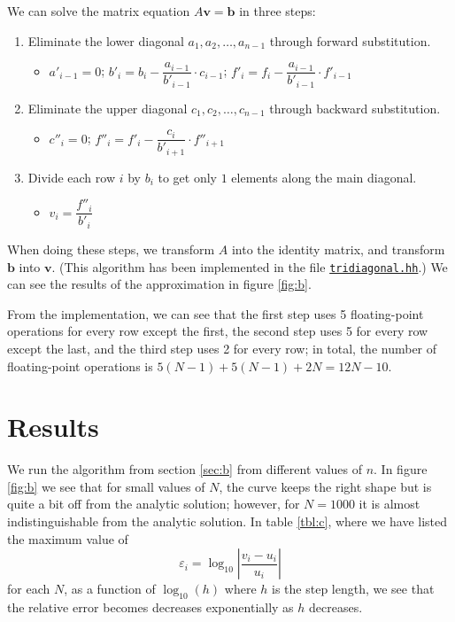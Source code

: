 \documentclass[12pt,a4paper]{article}
\newcommand\V[1]{\mathbf{#1}}                  %
\begin{document}
We can solve the matrix equation $A \V{v} = \V{b}$ in three steps:
\begin{enumerate}
  \item Eliminate the lower diagonal $a_1,a_2,\ldots,a_{n-1}$ through forward substitution.
    \begin{itemize}
      \item $a'_{i-1} = 0$; $b'_i = b_i - \dfrac{a_{i-1}}{b'_{i-1}} \cdot c_{i-1}$; $ f'_i = f_i - \dfrac{a_{i-1}}{b'_{i-1}} \cdot f'_{i-1}$
    \end{itemize}
  \item Eliminate the upper diagonal $c_1,c_2,\ldots,c_{n-1}$ through backward substitution.
    \begin{itemize}
      \item $c''_{i} = 0$; $f''_{i} = f'_{i} - \dfrac{c_i}{b'_{i+1}} \cdot f''_{i+1}$
    \end{itemize}
  \item Divide each row $i$ by $b_i$ to get only $1$ elements along the main diagonal.
    \begin{itemize}
      \item $v_i = \dfrac{f''_i}{b'_i}$
    \end{itemize}
\end{enumerate}
When doing these steps, we transform $A$ into the identity matrix, and transform $\V{b}$ into $\V{v}$. (This algorithm has been implemented in the file \href{https://github.com/frxstrem/fys3150/tree/master/project1/tridiagonal.hh}{\tt tridiagonal.hh}.) We can see the results of the approximation in figure \ref{fig:b}.

From the implementation, we can see that the first step uses 5 floating-point operations for every row except the first, the second step uses 5 for every row except the last, and the third step uses 2 for every row; in total, the number of floating-point operations is $5 (N - 1) + 5 (N - 1) + 2 N = 12N - 10$.

\section{Results}

We run the algorithm from section \ref{sec:b} from different values of $n$. In figure \ref{fig:b} we see that for small values of $N$, the curve keeps the right shape but is quite a bit off from the analytic solution; however, for $N = 1000$ it is almost indistinguishable from the analytic solution. In table \ref{tbl:c}, where we have listed the maximum value of
\begin{equation}
  \varepsilon_i = \log_{10}\left| \frac{v_i - u_i}{u_i} \right|
\end{equation}
for each $N$, as a function of $\log_{10}(h)$ where $h$ is the step length, we see that the relative error becomes decreases exponentially as $h$ decreases.
\end{document}

